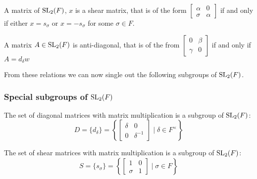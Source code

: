 \begin{remark}
    \label{SpecialLinearGroup.fin_two_shear_iff}
    \leanok
    A matrix of $\operatorname{SL}_2(F)$, $x$ is a shear matrix, that is of the form $\begin{bmatrix}
        \alpha & 0\\
        \sigma & \alpha
    \end{bmatrix}$ if and only if either $x = s_\sigma$ or $x = - s_\sigma$ for some $\sigma \in F$.
\end{remark}

\begin{remark}
    \label{SpecialLinearGroup.fin_two_antidiagonal_iff}
    \leanok
    A matrix $A \in \operatorname{SL}_2(F)$ is anti-diagonal, that is of the from $\begin{bmatrix}
        0 & \beta\\
        \gamma & 0
    \end{bmatrix}$ if and only if $A = d_\delta w$
    
\end{remark}

From these relations we can now single out the following subgroups of $\operatorname{SL}_2(F)$.

\subsubsection{Special subgroups of $\operatorname{SL}_2(F)$}

\begin{definition}
\label{SpecialSubgroups.D}
\leanok
    The set of diagonal matrices with matrix multiplication is a subgroup of $\operatorname{SL}_2(F)$: 
    \[
    D = \{d_\delta \} = \left\{ \begin{bmatrix}\delta & 0\\ 0 & \delta^{-1}\end{bmatrix} \; | \; \delta \in F^\times \right\}
    \]
\end{definition}

\begin{definition}
\label{SpecialSubgroups.S}
\leanok
    The set of shear matrices with matrix multiplication is a subgroup of $\operatorname{SL}_2(F)$:
    \[
    S = \{s_\sigma\} = \left\{\begin{bmatrix}1 & 0\\ \sigma & 1\end{bmatrix} \; | \; \sigma \in F \right\}
    \]
\end{definition}

